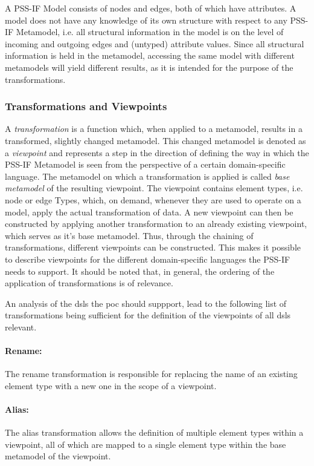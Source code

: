 A PSS-IF Model consists of nodes and edges, both of which have attributes. A model does not have any knowledge of its own structure with respect to any PSS-IF Metamodel, i.e. all structural information in the model is on the level of incoming and outgoing edges and (untyped) attribute values. Since all structural information is held in the metamodel, accessing the same model with different metamodels will yield different results, as it is intended for the purpose of the transformations.

\subsubsection{Transformations and Viewpoints}

A \textit{transformation} is a function which, when applied to a metamodel, results in a transformed, slightly changed metamodel. This changed metamodel is denoted as a \textit{viewpoint} and represents a step in the direction of defining the way in which the PSS-IF Metamodel is seen from the perspective of a certain domain-specific language. The metamodel on which a transformation is applied is called \textit{base metamodel} of the resulting viewpoint. The viewpoint contains element types, i.e. node or edge Types, which, on demand, whenever they are used to operate on a model, apply the actual transformation of data. A new viewpoint can then be constructed by applying another transformation to an already existing viewpoint, which serves as it's base metamodel. Thus, through the chaining of transformations, different viewpoints can be constructed. This makes it possible to describe viewpoints for the different domain-specific languages the PSS-IF needs to support. It should be noted that, in general, the ordering of the application of transformations is of relevance. 

An analysis of the \glspl{dsl} the \gls{poc} should suppport, lead to the following list of transformations being sufficient for the definition of the viewpoints of all \glspl{dsl} relevant.

\paragraph{Rename:} The rename transformation is responsible for replacing the name of an existing element type with a new one in the scope of a viewpoint.

\paragraph{Alias:} The alias transformation allows the definition of multiple element types within a viewpoint, all of which are mapped to a single element type within the base metamodel of the viewpoint.

